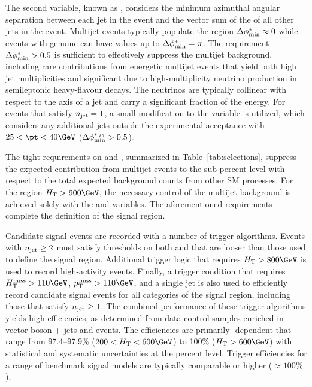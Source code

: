 The second variable, known as \bdphi, considers the minimum azimuthal
angular separation between each jet in the event and the vector sum of
the \pt of all other jets in the event. Multijet events typically
populate the region $\Delta\phi^{*}_\text{min} \approx 0$ while events with genuine
\ptvecmiss can have values up to $\Delta\phi^{*}_\text{min} = \pi$. The requirement
$\Delta\phi^{*}_\text{min} > 0.5$ is sufficient to effectively suppress the multijet
background, including rare contributions from energetic multijet
events that yield both high jet multiplicities and significant
\ptvecmiss due to high-multiplicity neutrino production in
semileptonic heavy-flavour decays. The neutrinos are typically
collinear with respect to the axis of a jet and carry a significant
fraction of the energy. For events that satisfy $n_{\text{jet}} = 1$, a small
modification to the \bdphi variable is utilized, which considers any
additional jets outside the experimental acceptance with $25 < \pt <
40\GeV$ ($\Delta\phi^{*_{\, 25}}_\text{min} > 0.5$).

The tight requirements on \alphat and \bdphi, summarized in
Table~\ref{tab:selections}, suppress the expected contribution from
multijet events to the sub-percent level with respect to the total
expected background counts from other SM processes. For the region
$\scalht > 900\GeV$, the necessary control of the multijet background
is achieved solely with the \bdphi and \bdphimod variables. The
aforementioned requirements complete the definition of the signal
region.

Candidate signal events are recorded with a number of trigger
algorithms. Events with $n_{\text{jet}} \geq 2$ must satisfy thresholds on both
\scalht and \alphat that are looser than those used to define the
signal region. Additional trigger logic that requires $\scalht >
800\GeV$ is used to record high-activity events. Finally, a trigger
condition that requires $\mht > 110\GeV$, $\ptmiss > 110\GeV$, and a
single jet is also used to efficiently record candidate signal events
for all categories of the signal region, including those that satisfy
$n_{\text{jet}} \geq 1$. The combined performance of these trigger algorithms
yields high efficiencies, as determined from data control samples
enriched in vector boson + jets and \ttbar events. The efficiencies
are primarily \scalht-dependent that range from 97.4--97.9\% ($200 <
\scalht < 600\GeV$) to 100\% ($\scalht > 600\GeV$) with statistical
and systematic uncertainties at the percent level. Trigger
efficiencies for a range of benchmark signal models are typically
comparable or higher (${\approx}100\%$).


